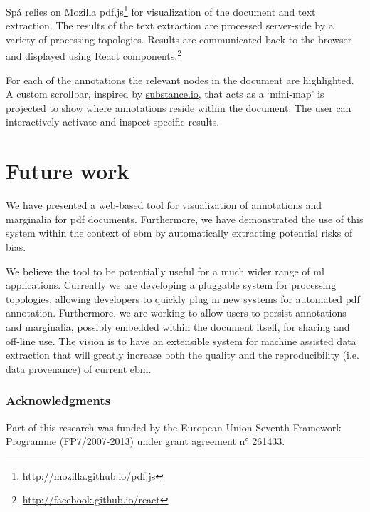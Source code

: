 \documentclass{llncs}
\begin{document}
Spá relies on Mozilla pdf.js\footnote{\url{http://mozilla.github.io/pdf.js}} for visualization of the document and text extraction.
The results of the text extraction are processed server-side by a variety of processing topologies.
Results are communicated back to the browser and displayed using React components.\footnote{\url{http://facebook.github.io/react}}

For each of the annotations the relevant nodes in the document are highlighted.
A custom scrollbar, inspired by \href{http://substance.io/}{substance.io}, that acts as a `mini-map' is projected to show where annotations reside within the document.
The user can interactively activate and inspect specific results.

\section{Future work}
We have presented a web-based tool for visualization of annotations and marginalia for \ac{pdf} documents.
Furthermore, we have demonstrated the use of this system within the context of \acl{ebm} by automatically extracting potential risks of bias.

We believe the tool to be potentially useful for a much wider range of \acl{ml} applications.
Currently we are developing a pluggable system for processing topologies, allowing developers to quickly plug in new systems for automated \ac{pdf} annotation.
Furthermore, we are working to allow users to persist annotations and marginalia, possibly embedded within the document itself, for sharing and off-line use.
The vision is to have an extensible system for machine assisted data extraction that will greatly increase both the quality and the reproducibility (i.e. data provenance) of current \acl{ebm}.

\subsubsection{Acknowledgments}
Part of this research was funded by the European Union Seventh Framework Programme (FP7/2007-2013) under grant agreement n° 261433.



\end{document}

